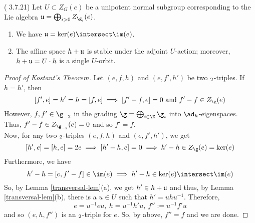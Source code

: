 \documentclass[springer-theory-notes.tex]{subfiles}
\begin{document}
\begin{lem}\label{transversal-lem}
  (\cite{cg} 3.7.21) Let \(U \subset Z_G(e)\) be a unipotent normal subgroup
  corresponding to the Lie algebra \(\u = \bigoplus_{i > 0} Z_{\g_i}(e)\).
  \begin{enumerate}
  \item We have \(\u = \ker(e) \intersect \im(e)\).
  \item The affine space \(h + \mathfrak{u}\) is stable under the adjoint
    \(U\)-action; moreover, \(h+\mathfrak{u} = U \cdot h\) is a single \(U\)-orbit.
  \end{enumerate}
\end{lem}
\begin{proof}[Proof of Kostant's Theorem]
  Let \((e,f,h)\) and \((e,f',h')\) be two \(\sl_2\)-triples. If
  \(h=h'\), then \[
    [f',e] = h' = h = [f,e] \implies [f'-f,e] = 0 \text{ and } f'-f
    \in Z_\g(e)
  \]
  However, \(f,f' \in \g_{-2}\) in the grading \(\g = \bigoplus_{i \in
 \Z} \g_i\) into \(\ad_h\)-eigenspaces. Thus, \(f'-f \in
  Z_{\g_{-2}}(e) = 0\) and so \(f' = f\). \\

  Now, for any two \(\sl_2\)-triples \((e,f,h)\) and \((e,f',h')\), we
  get \[
    [h',e] = [h,e] = 2e \implies [h'-h,e] = 0 \implies h'-h \in
    Z_\g(e) = \ker(e)
  \]
  Furthermore, we have \[
    h'-h = [e,f'-f] \in \im(e) \implies h'-h \in \ker(e) \intersect \im(e)
  \]
  So, by Lemma \ref{transversal-lem}(a), we get \(h' \in h + \mathfrak{u}\)
  and thus, by Lemma \ref{transversal-lem}(b), there is a \(u \in
  U\) such that \(h' = uhu^{-1}\). Therefore, \[
    e = u^{-1}eu, \ h = u^{-1}h'u, \ f'' := u^{-1}f' u
  \]
  and so \((e,h,f'')\) is an \(\sl_2\)-triple for \(e\). So, by above,
  \(f'' = f\) and we are done.
\end{proof}
\end{document}

